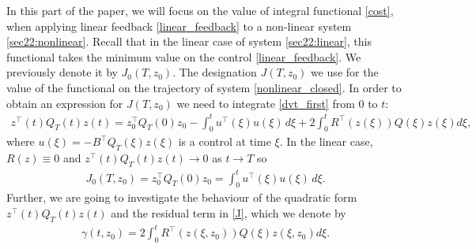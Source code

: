 \documentclass[../main.tex]{subfiles}
\begin{document}
In this part  of the paper, we will focus on the value of integral functional \eqref{cost}, when applying linear feedback \eqref{linear_feedback} to a non-linear system \eqref{sec22:nonlinear}. Recall that in the linear case of system \eqref{sec22:linear}, this functional takes the minimum value on the control \eqref{linear_feedback}. We previously denote it by $J_0(T,z_0)$. The designation $J(T,z_0)$ we use for the value of the functional on the trajectory  of system \eqref{nonlinear_closed}.
 In order to obtain an  expression for $J(T,z_0)$ we need to integrate \eqref{dvt_first} from $0$ to $t$:
\begin{gather}\label{J}
	z^{\top}(t) Q_T(t)z(t) = z_0^{\top} Q_T(0)z_0 - \int_{0}^{t} u^{\top}(\xi)  u(\xi) \, d\xi + 2\int_{0}^{t}  R^{\top}(z(\xi))Q(\xi) z(\xi) d\xi,
\end{gather}
    where $ u(\xi) = -B^{\top} Q_T(\xi) z(\xi)$ is a control at time $\xi$. In the linear case, $R(z) \equiv 0$ and $z^{\top}(t) Q_T(t)z(t) \to 0 $ as $t \to T$ so
\begin{gather*}
    J_0(T,z_0) = z_0^{\top} Q_T(0)z_0 = \int_{0}^{t} u^{\top}(\xi)  u(\xi) \, d\xi.
\end{gather*}
Further, we are going to investigate the behaviour of the quadratic form $z^{\top}(t) Q_T(t)z(t) $ and the residual term in \eqref{J}, which we denote by
\begin{gather*}
			\gamma (t,z_0) = 
		 2\int_{0}^{t}  R^{\top}(z(\xi,z_0))Q(\xi) z(\xi,z_0) d\xi.
\end{gather*}
\end{document}
